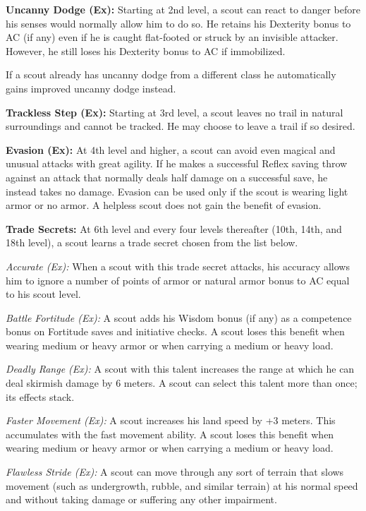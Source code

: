 \textbf{Uncanny Dodge (Ex):} Starting at 2nd level, a scout can react to danger before his senses would normally allow him to do so. He retains his Dexterity bonus to AC (if any) even if he is caught flat-footed or struck by an invisible attacker. However, he still loses his Dexterity bonus to AC if immobilized.

If a scout already has uncanny dodge from a different class he automatically gains improved uncanny dodge instead.


\textbf{Trackless Step (Ex):} Starting at 3rd level, a scout leaves no trail in natural surroundings and cannot be tracked. He may choose to leave a trail if so desired.


\textbf{Evasion (Ex):} At 4th level and higher, a scout can avoid even magical and unusual attacks with great agility. If he makes a successful Reflex saving throw against an attack that normally deals half damage on a successful save, he instead takes no damage. Evasion can be used only if the scout is wearing light armor or no armor. A helpless scout does not gain the benefit of evasion.


\textbf{Trade Secrets:} At 6th level and every four levels thereafter (10th, 14th, and 18th level), a scout learns a trade secret chosen from the list below.

\textit{Accurate (Ex):} When a scout with this trade secret attacks, his accuracy allows him to ignore a number of points of armor or natural armor bonus to AC equal to \onequarter his scout level.

\textit{Battle Fortitude (Ex):} A scout adds his Wisdom bonus (if any) as a competence bonus on Fortitude saves and initiative checks. A scout loses this benefit when wearing medium or heavy armor or when carrying a medium or heavy load.

\textit{Deadly Range (Ex):} A scout with this talent increases the range at which he can deal skirmish damage by 6 meters. A scout can select this talent more than once; its effects stack.

\textit{Faster Movement (Ex):} A scout increases his land speed by +3 meters. This accumulates with the fast movement ability. A scout loses this benefit when wearing medium or heavy armor or when carrying a medium or heavy load.

\textit{Flawless Stride (Ex):} A scout can move through any sort of terrain that slows movement (such as undergrowth, rubble, and similar terrain) at his normal speed and without taking damage or suffering any other impairment.

